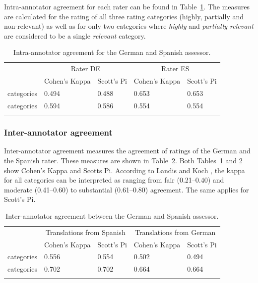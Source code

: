 \documentclass[a4paper,11pt]{article}
\begin{document}
Intra-annotator agreement for each rater can be found in Table~\ref{tab:Intrapilot}. The measures are calculated for the rating of all three rating categories (highly, partially and non-relevant) as well as for only two categories where \textit{highly} and \textit{partially relevant} are considered to be a single \textit{relevant} category. 

\begin{table}[h]
\begin{tabularx}{\textwidth}{p{2cm}llll}
 \addlinespace
 \toprule
 \addlinespace
 &
 \multicolumn{2}{c}{Rater DE} &
 \multicolumn{2}{c}{Rater ES}\\
 \addlinespace
 \cmidrule{2-5}
 \addlinespace
 & Cohen’s Kappa & Scott’s Pi & Cohen’s Kappa & Scott’s Pi\\
\addlinespace
\cmidrule{2-5}
\addlinespace
3 categories & 0.494 & 0.488 & 0.653 & 0.653\\ 
\addlinespace
\cmidrule{1-5}
\addlinespace
2 categories & 0.594 & 0.586 & 0.554 & 0.554\\
\addlinespace
\bottomrule
\end{tabularx}
\caption{Intra-annotator agreement for the German and Spanish assessor.}
\label{tab:Intrapilot}
\end{table}

\subsubsection{Inter-annotator agreement}
\label{subsec:inter}
Inter-annotator agreement measures the agreement of ratings of the German and the Spanish rater. These measures are shown in Table~\ref{tab:Interpilot}. Both Tables~\ref{tab:Intrapilot} and \ref{tab:Interpilot} show Cohen's Kappa and Scotts Pi. According to Landis and Koch \cite{landis_koch}, the kappa for all categories can be interpreted as ranging from fair (0.21--0.40) and moderate (0.41--0.60) to  substantial (0.61--0.80) agreement. The same applies for Scott's Pi.

\begin{table}[h]
\begin{tabularx}{\textwidth}{p{2cm}llll}
 \addlinespace
 \toprule
 \addlinespace
 &
 \multicolumn{2}{c}{Translations from Spanish} &
 \multicolumn{2}{c}{Translations from German}\\
 \addlinespace
 \cmidrule{2-5}
 \addlinespace
 & Cohen’s Kappa & Scott’s Pi & Cohen’s Kappa & Scott’s Pi\\
\addlinespace
\cmidrule{2-5}
\addlinespace
3 categories & 0.556 & 0.554 & 0.502 & 0.494\\ 
\addlinespace
\cmidrule{1-5}
\addlinespace
2 categories & 0.702 & 0.702 & 0.664 & 0.664\\
\addlinespace
\bottomrule
\end{tabularx}
\caption{Inter-annotator agreement between the German and Spanish assessor.}
\label{tab:Interpilot}
\end{table}
\end{document}
